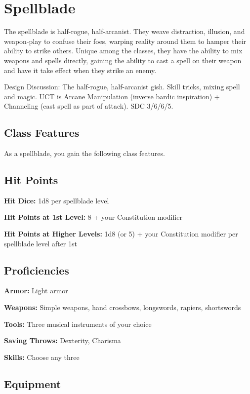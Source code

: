 \section{Spellblade}\label{class:spellblade}

The spellblade is half-rogue, half-arcanist. They weave distraction, illusion, and weapon-play to confuse their foes, warping reality around them to hamper their ability to strike others. Unique among the classes, they have the ability to mix weapons and spells directly, gaining the ability to cast a spell on their weapon and have it take effect when they strike an enemy.

Design Discussion: The half-rogue, half-arcanist gish. Skill tricks, mixing spell and magic. UCT is Arcane Manipulation (inverse bardic inspiration) + Channeling (cast spell as part of attack). SDC 3/6/6/5.

\subsection{Class Features}

As a spellblade, you gain the following class features.

\subsection{Hit Points}

\textbf{Hit Dice:} 1d8 per spellblade level

\textbf{Hit Points at 1st Level:} 8 + your Constitution modifier

\textbf{Hit Points at Higher Levels:} 1d8 (or 5) + your Constitution modifier per spellblade level after 1st

\subsection{Proficiencies}

\textbf{Armor:} Light armor

\textbf{Weapons:} Simple weapons, hand crossbows, longswords, rapiers, shortswords

\textbf{Tools:} Three musical instruments of your choice

\textbf{Saving Throws:} Dexterity, Charisma

\textbf{Skills:} Choose any three

\subsection{Equipment}

